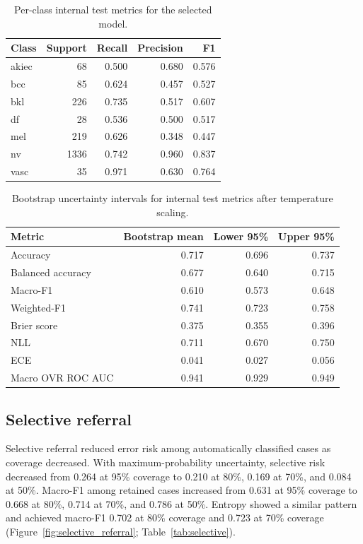 \documentclass[11pt,a4paper]{article}
\begin{document}
\begin{table}[H]
\centering
\caption{Per-class internal test metrics for the selected model.}
\label{tab:per_class}
\begin{tabular}{lrrrr}
\toprule
Class & Support & Recall & Precision & F1 \\
\midrule
akiec & 68 & 0.500 & 0.680 & 0.576 \\
bcc & 85 & 0.624 & 0.457 & 0.527 \\
bkl & 226 & 0.735 & 0.517 & 0.607 \\
df & 28 & 0.536 & 0.500 & 0.517 \\
mel & 219 & 0.626 & 0.348 & 0.447 \\
nv & 1336 & 0.742 & 0.960 & 0.837 \\
vasc & 35 & 0.971 & 0.630 & 0.764 \\
\bottomrule
\end{tabular}
\end{table}

\begin{table}[H]
\centering
\caption{Bootstrap uncertainty intervals for internal test metrics after temperature scaling.}
\label{tab:bootstrap}
\begin{tabular}{lrrr}
\toprule
Metric & Bootstrap mean & Lower 95\% & Upper 95\% \\
\midrule
Accuracy & 0.717 & 0.696 & 0.737 \\
Balanced accuracy & 0.677 & 0.640 & 0.715 \\
Macro-F1 & 0.610 & 0.573 & 0.648 \\
Weighted-F1 & 0.741 & 0.723 & 0.758 \\
Brier score & 0.375 & 0.355 & 0.396 \\
NLL & 0.711 & 0.670 & 0.750 \\
ECE & 0.041 & 0.027 & 0.056 \\
Macro OVR ROC AUC & 0.941 & 0.929 & 0.949 \\
\bottomrule
\end{tabular}
\end{table}

\subsection{Selective referral}

Selective referral reduced error risk among automatically classified cases as coverage decreased. With maximum-probability uncertainty, selective risk decreased from 0.264 at 95\% coverage to 0.210 at 80\%, 0.169 at 70\%, and 0.084 at 50\%. Macro-F1 among retained cases increased from 0.631 at 95\% coverage to 0.668 at 80\%, 0.714 at 70\%, and 0.786 at 50\%. Entropy showed a similar pattern and achieved macro-F1 0.702 at 80\% coverage and 0.723 at 70\% coverage (Figure~\ref{fig:selective_referral}; Table~\ref{tab:selective}).
\end{document}
